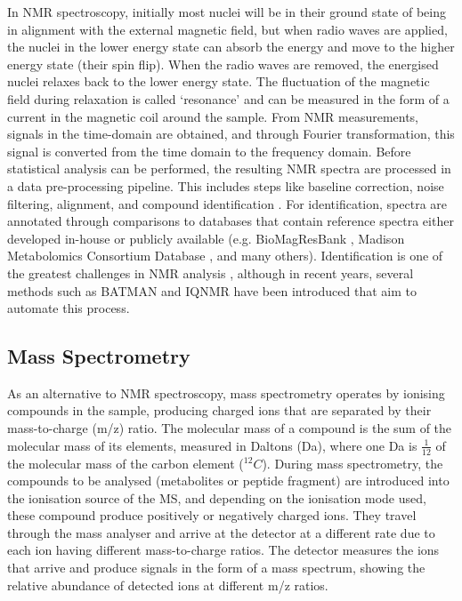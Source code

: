 In NMR spectroscopy, initially most nuclei will be in their ground state of being in alignment with the external magnetic field, but when radio waves are applied, the nuclei in the lower energy state can absorb the energy and move to the higher energy state (their spin flip). When the radio waves are removed, the energised nuclei relaxes back to the lower energy state. The fluctuation of the magnetic field during relaxation is called `resonance' and can be measured in the form of a current in the magnetic coil around the sample. From NMR measurements, signals in the time-domain are obtained, and through Fourier transformation, this signal is converted from the time domain to the frequency domain. Before statistical analysis can be performed, the resulting NMR spectra are processed in a data pre-processing pipeline. This includes steps like baseline correction, noise filtering, alignment, and compound identification \cite{Alonso2015}. For identification, spectra are annotated through comparisons to databases that contain reference spectra either developed in-house or publicly available (e.g. BioMagResBank \cite{Ulrich01012008}, Madison Metabolomics Consortium Database \cite{cui2008metabolite}, and many others). Identification is one of the greatest challenges in NMR analysis \cite{Pan2007}, although in recent years, several methods such as BATMAN \cite{hao2012batman} and IQNMR \cite{song2011iqmnmr} have been introduced that aim to automate this process.

\subsection{Mass Spectrometry}

As an alternative to NMR spectroscopy, mass spectrometry operates by ionising compounds in the sample, producing charged ions that are separated by their mass-to-charge (m/z) ratio. The molecular mass of a compound is the sum of the molecular mass of its elements, measured in Daltons (Da), where one Da is $\frac{1}{12}$ of the molecular mass of the carbon element ($^{12}C$). During mass spectrometry, the compounds to be analysed (metabolites or peptide fragment) are introduced into the ionisation source of the MS, and depending on the ionisation mode used, these compound produce positively or negatively charged ions. They travel through the mass analyser and arrive at the detector at a different rate due to each ion having different mass-to-charge ratios. The detector measures the ions that arrive and produce signals in the form of a mass spectrum, showing the relative abundance of detected ions at different m/z ratios. 

